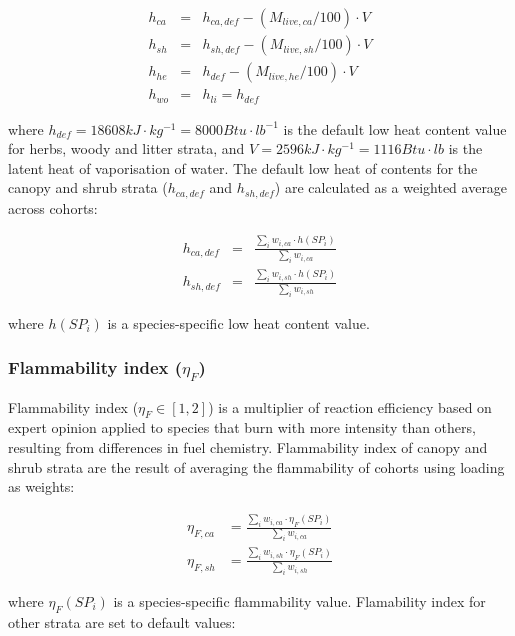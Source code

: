 \documentclass[]{book}
\begin{document}
\begin{eqnarray}
h_{ca} &=& h_{ca, def} - (M_{live, ca}/100)\cdot V \\
h_{sh} &=& h_{sh, def} - (M_{live, sh}/100)\cdot V \\
h_{he} &=& h_{def} - (M_{live, he}/100)\cdot V \\
h_{wo} &=& h_{li} = h_{def}
\end{eqnarray}

where \(h_{def} = 18608 kJ\cdot kg^{-1} = 8000 Btu\cdot lb^{-1}\) is the
default low heat content value for herbs, woody and litter strata, and
\(V = 2596 kJ\cdot kg^{-1} = 1116 Btu\cdot lb\) is the latent heat of
vaporisation of water. The default low heat of contents for the canopy
and shrub strata (\(h_{ca, def}\) and \(h_{sh, def}\)) are calculated as
a weighted average across cohorts:

\begin{eqnarray}
h_{ca, def} &=& \frac{\sum_{i}{w_{i,ca} \cdot h(SP_i)}}{\sum_{i}{w_{i,ca}}}\\
h_{sh, def} &=& \frac{\sum_{i}{w_{i,sh} \cdot h(SP_i)}}{\sum_{i}{w_{i,sh}}}
\end{eqnarray}

where \(h(SP_i)\) is a species-specific low heat content value.

\subsubsection{\texorpdfstring{Flammability index
(\(\eta_{F}\))}{Flammability index (\textbackslash{}eta\_\{F\})}}\label{flammability-index-eta_f}

Flammability index (\(\eta_{F} \in [1, 2]\)) is a multiplier of reaction
efficiency based on expert opinion applied to species that burn with
more intensity than others, resulting from differences in fuel
chemistry. Flammability index of canopy and shrub strata are the result
of averaging the flammability of cohorts using loading as weights:

\begin{eqnarray}
\eta_{F, ca} &= \frac{\sum_{i}{w_{i,ca} \cdot \eta_{F}(SP_i)}}{\sum_{i}{w_{i,ca}}}\\
\eta_{F, sh} &= \frac{\sum_{i}{w_{i,sh} \cdot \eta_{F}(SP_i)}}{\sum_{i}{w_{i,sh}}}
\end{eqnarray}

where \(\eta_{F}(SP_i)\) is a species-specific flammability value.
Flamability index for other strata are set to default values:
\end{document}
